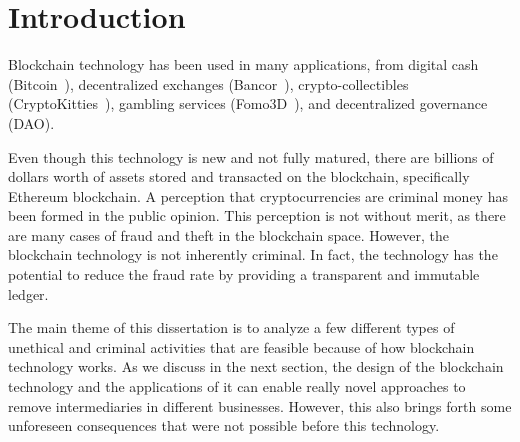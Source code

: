 








\chapter{Introduction} \label{sec:intro}

Blockchain technology has been used in many applications, from digital cash (\eg Bitcoin~\cite{nakamoto2008bitcoin}), decentralized exchanges (\eg Bancor~\cite{hertzog2017bancor}), crypto-collectibles (\eg CryptoKitties~\cite{cryptokitties}), gambling services (\eg Fomo3D~\cite{fomo3dmedium}), and decentralized governance~\cite{aragonwebsite} (\eg DAO).

Even though this technology is new and not fully matured, there are billions of dollars worth of assets stored and transacted on the blockchain, specifically Ethereum blockchain. A perception that cryptocurrencies are criminal money has been formed in the public opinion. This perception is not without merit, as there are many cases of fraud and theft in the blockchain space. However, the blockchain technology is not inherently criminal. In fact, the technology has the potential to reduce the fraud rate by providing a transparent and immutable ledger.

The main theme of this dissertation is to analyze a few different types of unethical and criminal activities that are feasible because of how blockchain technology works. As we discuss in the next section, the design of the blockchain technology and the applications of it can enable really novel approaches to remove intermediaries in different businesses. However, this also brings forth some unforeseen consequences that were not possible before this technology.


